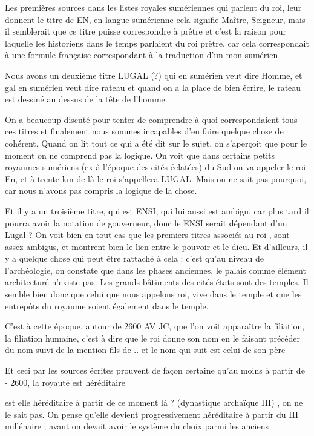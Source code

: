 \documentclass[a4paper,10pt]{article}
\begin{document}
\begin{itemize}
Les premières sources dans les listes royales sumériennes qui parlent du
roi, leur donnent le titre de EN, en langue sumérienne cela signifie
Maître, Seigneur, mais il semblerait que ce titre puisse correspondre à
prêtre et c'est la raison pour laquelle les historiens
dans le temps parlaient du roi prêtre, car cela correspondait à une
formule française correspondant à la traduction d'un
mon sumérien 

Nous avons un deuxième titre  LUGAL (?) qui en sumérien veut dire Homme,
et gal en sumérien veut dire rateau et quand on a la place de bien
écrire, le rateau est dessiné au dessus de la tête de
l'homme.

On a beaucoup discuté pour tenter de comprendre à quoi correspondaient
tous ces titres et finalement nous sommes incapables
d'en faire quelque chose de cohérent, Quand on lit
tout ce qui a été dit sur le sujet, on s'aperçoit que
pour le moment on ne comprend pas la logique. On voit que dans certains
petits royaumes sumériens (ex à l'époque des cités
éclatées) du Sud on va appeler le roi En, et à trente km de là  le roi
s'appellera LUGAL. Mais on ne sait pas pourquoi, car
nous n'avons pas compris la logique de la chose.

Et il y a un troisième titre, qui est ENSI, qui lui aussi est ambigu,
car plus tard il pourra avoir la notation de gouverneur, donc le ENSI
serait dépendant d'un Lugal ?  On voit bien en tout
cas que les premiers titres associés au roi , sont assez ambigus, et
montrent bien le lien entre le pouvoir et le dieu. Et
d'ailleurs, il y a quelque chose qui peut être
rattaché à cela  : c'est qu'au niveau
de l'archéologie, on constate que dans les phases
anciennes, le palais comme élément architecturé
n'existe pas. Les grands bâtiments des cités états
sont des temples. Il semble bien donc que celui que nous appelons roi,
vive dans le temple et que les entrepôts du royaume soient également
dans le temple.

C'est à cette époque, autour de 2600 AV JC, que
l'on voit apparaître la filiation, la filiation
humaine, c'est à dire que le roi donne son nom en le
faisant précéder du nom suivi de la mention {\textquotedbl} fils de ..
{\textquotedbl} et le nom qui suit est celui de son père

Et ceci par les sources écrites prouvent de façon certaine
qu'au moins à partir de - 2600, la royauté est
héréditaire

est elle héréditaire à partir de ce moment là ? (dynastique archaïque
III) , on  ne le sait pas. On pense qu'elle devient
progressivement héréditaire à partir du III millénaire ; avant on
devait avoir le système du choix parmi les anciens


\end{itemize}
\end{document}
